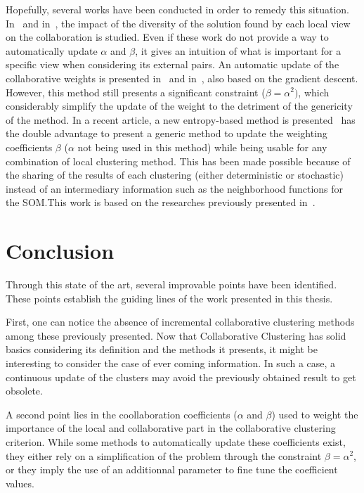     Hopefully, several works have been conducted in order to remedy this situation. In~\cite{grozavu2014diversity} and in~\cite{rastin2015collaborative}, the impact of the diversity of the solution found by each local view on the collaboration is studied. Even if these work do not provide a way to automatically update $\alpha$ and $\beta$, it gives an intuition of what is important for a specific view when considering its external pairs. An automatic update of the collaborative weights is presented in~\cite{grozavu2010topological} and in~\cite{grozavu2011learning}, also based on the gradient descent. However, this method still presents a significant constraint ($\beta = \alpha^2)$, which considerably simplify the update of the weight to the detriment of the genericity of the method. In a recent article, a new entropy-based method is presented~\cite{sublime2018optimizing} has the double advantage to present a generic method to update the weighting coefficients $\beta$ ($\alpha$ not being used in this method) while being usable for any combination of local clustering method. This has been made possible because of the sharing of the results of each clustering (either deterministic or stochastic) instead of an intermediary information such as the neighborhood functions for the SOM.\@ This work is based on the researches previously presented in~\cite{sublime2016contributions}.

    \section{Conclusion}

    Through this state of the art, several improvable points have been identified. These points establish the guiding lines of the work presented in this thesis.

    First, one can notice the absence of incremental collaborative clustering methods among these previously presented. Now that Collaborative Clustering has solid basics considering its definition and the methods it presents, it might be interesting to consider the case of ever coming information. In such a case, a continuous update of the clusters may avoid the previously obtained result to get obsolete.

    A second point lies in the coollaboration coefficients ($\alpha$ and $\beta$) used to weight the importance of the local and collaborative part in the collaborative clustering criterion. While some methods to automatically update these coefficients exist, they either rely on a simplification of the problem through the constraint $\beta = \alpha^2$, or they imply the use of an additionnal parameter to fine tune the coefficient values.


